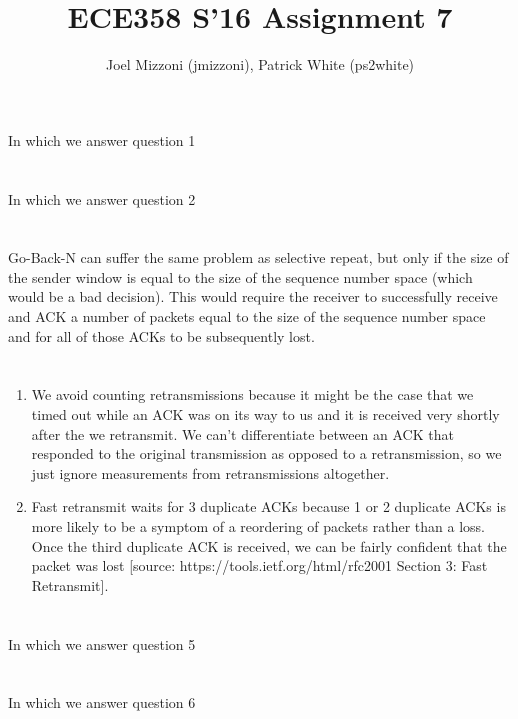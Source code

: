\documentclass[10pt,a4paper]{article}
\author{Joel Mizzoni (jmizzoni), Patrick White (ps2white)}
\begin{document}
\title{ECE358 S'16 Assignment 7}
\maketitle
\section{}
In which we answer question 1
\section{}
In which we answer question 2
\section{}
Go-Back-N can suffer the same problem as selective repeat, but only if the size of the sender window is equal to the size of the sequence number space (which would be a bad decision). This would require the receiver to successfully receive and ACK a number of packets equal to the size of the sequence number space and for all of those ACKs to be subsequently lost.

\section{}

\begin{enumerate}[label=\alph*)]
    \item
        We avoid counting retransmissions because it might be the case that we timed out while an ACK was on its way to us and it is received very shortly after the we retransmit. We can't differentiate between an ACK that responded to the original transmission as opposed to a retransmission, so we just ignore measurements from retransmissions altogether.
    \item
        Fast retransmit waits for 3 duplicate ACKs because 1 or 2 duplicate ACKs is more likely to be a symptom of a reordering of packets rather than a loss. Once the third duplicate ACK is received, we can be fairly confident that the packet was lost [source: https://tools.ietf.org/html/rfc2001 Section 3: Fast Retransmit].
\end{enumerate}

\section{}
In which we answer question 5
\section{}
In which we answer question 6
\end{document}
